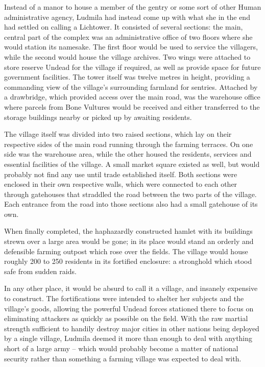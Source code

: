  

Instead of a manor to house a member of the gentry or some sort of other Human administrative agency, Ludmila had instead come up with what she in the end had settled on calling a Lichtower. It consisted of several sections: the main, central part of the complex was an administrative office of two floors where she would station its namesake. The first floor would be used to service the villagers, while the second would house the village archives. Two wings were attached to store reserve Undead for the village if required, as well as provide space for future government facilities. The tower itself was twelve metres in height, providing a commanding view of the village’s surrounding farmland for sentries. Attached by a drawbridge, which provided access over the main road, was the warehouse office where parcels from Bone Vultures would be received and either transferred to the storage buildings nearby or picked up by awaiting residents.

 

The village itself was divided into two raised sections, which lay on their respective sides of the main road running through the farming terraces. On one side was the warehouse area, while the other housed the residents, services and essential facilities of the village. A small market square existed as well, but would probably not find any use until trade established itself. Both sections were enclosed in their own respective walls, which were connected to each other through gatehouses that straddled the road between the two parts of the village. Each entrance from the road into those sections also had a small gatehouse of its own.

 

When finally completed, the haphazardly constructed hamlet with its buildings strewn over a large area would be gone; in its place would stand an orderly and defensible farming outpost which rose over the fields. The village would house roughly 200 to 250 residents in its fortified enclosure: a stronghold which stood safe from sudden raids.

 

In any other place, it would be absurd to call it a village, and insanely expensive to construct. The fortifications were intended to shelter her subjects and the village’s goods, allowing the powerful Undead forces stationed there to focus on eliminating attackers as quickly as possible on the field. With the raw martial strength sufficient to handily destroy major cities in other nations being deployed by a single village, Ludmila deemed it more than enough to deal with anything short of a large army – which would probably become a matter of national security rather than something a farming village was expected to deal with.

